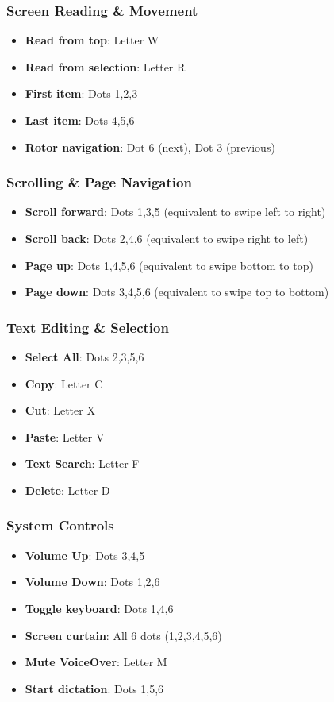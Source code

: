 \subsubsection{Screen Reading \& Movement}
\begin{itemize}
	\item \textbf{Read from top}: Letter W
	\item \textbf{Read from selection}: Letter R
	\item \textbf{First item}: Dots 1,2,3
	\item \textbf{Last item}: Dots 4,5,6
	\item \textbf{Rotor navigation}: Dot 6 (next), Dot 3 (previous)
\end{itemize}

\subsubsection{Scrolling \& Page Navigation}
\begin{itemize}
	\item \textbf{Scroll forward}: Dots 1,3,5 (equivalent to swipe left to right)
	\item \textbf{Scroll back}: Dots 2,4,6 (equivalent to swipe right to left)
	\item \textbf{Page up}: Dots 1,4,5,6 (equivalent to swipe bottom to top)
	\item \textbf{Page down}: Dots 3,4,5,6 (equivalent to swipe top to bottom)
\end{itemize}

\subsubsection{Text Editing \& Selection}
\begin{itemize}
	\item \textbf{Select All}: Dots 2,3,5,6
	\item \textbf{Copy}: Letter C
	\item \textbf{Cut}: Letter X
	\item \textbf{Paste}: Letter V
	\item \textbf{Text Search}: Letter F
	\item \textbf{Delete}: Letter D
\end{itemize}

\subsubsection{System Controls}
\begin{itemize}
	\item \textbf{Volume Up}: Dots 3,4,5
	\item \textbf{Volume Down}: Dots 1,2,6
	\item \textbf{Toggle keyboard}: Dots 1,4,6
	\item \textbf{Screen curtain}: All 6 dots (1,2,3,4,5,6)
	\item \textbf{Mute VoiceOver}: Letter M
	\item \textbf{Start dictation}: Dots 1,5,6
\end{itemize}

